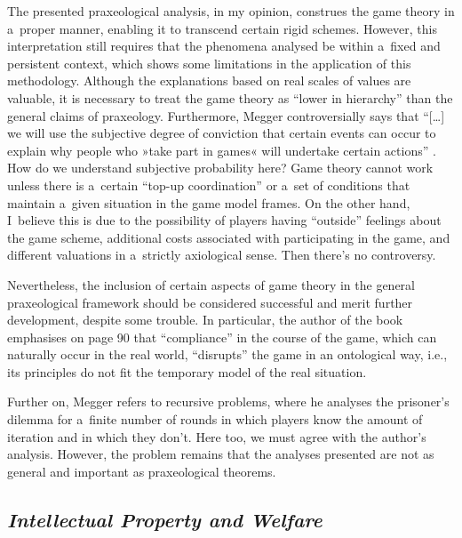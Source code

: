 The presented praxeological analysis, in my opinion, construes the game theory in a~proper manner, enabling it to transcend certain rigid schemes. However, this interpretation still requires that the phenomena analysed be within a~fixed and persistent context, which shows some limitations in the application of this methodology. Although the explanations based on real scales of values are valuable, it is necessary to treat the game theory as ``lower in hierarchy'' than the general claims of praxeology. Furthermore, Megger controversially says that ``[…] we will use the subjective degree of conviction that certain events can occur to explain why people who »take part in games« will undertake certain actions'' 
\parencite[][p.92]{megger_sprawiedliwosc_2021}. %
 How do we understand subjective probability here? Game theory cannot work unless there is a~certain ``top-up coordination'' or a~set of conditions that maintain a~given situation in the game model frames. On the other hand, I~believe this is due to the possibility of players having ``outside'' feelings about the game scheme, additional costs associated with participating in the game, and different valuations in a~strictly axiological sense. Then there's no controversy.



Nevertheless, the inclusion of certain aspects of game theory in the general praxeological framework should be considered successful and merit further development, despite some trouble. In particular, the author of the book emphasises on page 90 that ``compliance'' in the course of the game, which can naturally occur in the real world, ``disrupts'' the game in an ontological way, i.e., its principles do not fit the temporary model of the real situation.



Further on, Megger 
\parencite*[][pp.91–93]{megger_sprawiedliwosc_2021} %
 refers to recursive problems, where he analyses the prisoner's dilemma for a~finite number of rounds in which players know the amount of iteration and in which they don't. Here too, we must agree with the author's analysis. However, the problem remains that the analyses presented are not as general and important as praxeological theorems.



\subsection{\itshape Intellectual Property and Welfare}



